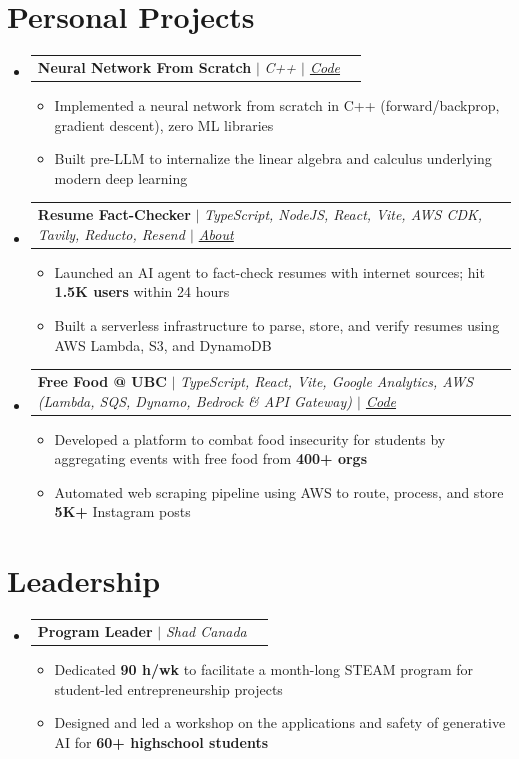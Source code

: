 \documentclass[letterpaper,11pt]{article}
\makeatletter
\newcommand{\resumeItem}[1]{
  \item\small{
    {#1 \vspace{-0.6pt}}
  }
}
\newcommand{\resumeSubheadingB}[3]{
  \vspace{0pt}\item
    \begin{tabular*}{0.97\textwidth}[t]{l@{\extracolsep{\fill}}r}
      \textbf{#1} $|$ \textit{#3} & #2 \\
    \end{tabular*}\vspace{-7pt}
}
\newcommand{\resumeProjectHeading}[2]{
    \item
    \begin{tabular*}{0.97\textwidth}{l@{\extracolsep{\fill}}r}
      \small#1 & #2 \\
    \end{tabular*}\vspace{-7pt}
}
\newcommand{\resumeSubHeadingListStart}{\begin{itemize}[leftmargin=0.15in, label={}]}
\newcommand{\resumeSubHeadingListEnd}{\end{itemize}}
\newcommand{\resumeItemListStart}{\begin{itemize}}
\newcommand{\resumeItemListEnd}{\end{itemize}\vspace{-7pt}}
\makeatother
\begin{document}
\section{Personal Projects}
  \resumeSubHeadingListStart
        \resumeProjectHeading
          {\textbf{Neural Network From Scratch} $|$ \emph{C++ $|$ \href{https://github.com/douglasichen/Neural-Network-From-Scratch}{{\underline{Code}}}}}{}
      \resumeItemListStart
        \resumeItem{Implemented a neural network from scratch in C++ (forward/backprop, gradient descent), zero ML libraries}
        \resumeItem{Built pre-LLM to internalize the linear algebra and calculus underlying modern deep learning}
      \resumeItemListEnd
        \resumeProjectHeading
          {\textbf{Resume Fact-Checker} $|$ \emph{TypeScript, NodeJS, React, Vite, AWS CDK, Tavily, Reducto, Resend $|$ \href{https://www.linkedin.com/feed/update/urn:li:activity:7424145830577729536/}{{\underline{About}}}}}{}
      \resumeItemListStart
        \resumeItem{Launched an AI agent to fact-check resumes with internet sources; hit \textbf{1.5K users} within 24 hours}
        \resumeItem{Built a serverless infrastructure to parse, store, and verify resumes using AWS Lambda, S3, and DynamoDB}
      \resumeItemListEnd
        \resumeProjectHeading
          {\textbf{Free Food @ UBC} $|$ \emph{TypeScript, React, Vite, Google Analytics, AWS (Lambda, SQS, Dynamo, Bedrock \& API Gateway) $|$ \href{https://github.com/douglasichen/ubceventscdk}{{\underline{Code}}}}}{}
      \resumeItemListStart
        \resumeItem{Developed a platform to combat food insecurity for students by aggregating events with free food from \textbf{400+ orgs}}
        \resumeItem{Automated web scraping pipeline using AWS to route, process, and store \textbf{5K+} Instagram posts}
      \resumeItemListEnd
  \resumeSubHeadingListEnd

\section{Leadership}
  \resumeSubHeadingListStart
    \resumeSubheadingB{Program Leader}{}{Shad Canada}
      \resumeItemListStart
        \resumeItem{Dedicated \textbf{90 h/wk} to facilitate a month-long STEAM program for student-led entrepreneurship projects}
        \resumeItem{Designed and led a workshop on the applications and safety of generative AI for \textbf{60+ highschool students}}
      \resumeItemListEnd
  \resumeSubHeadingListEnd
\end{document}
